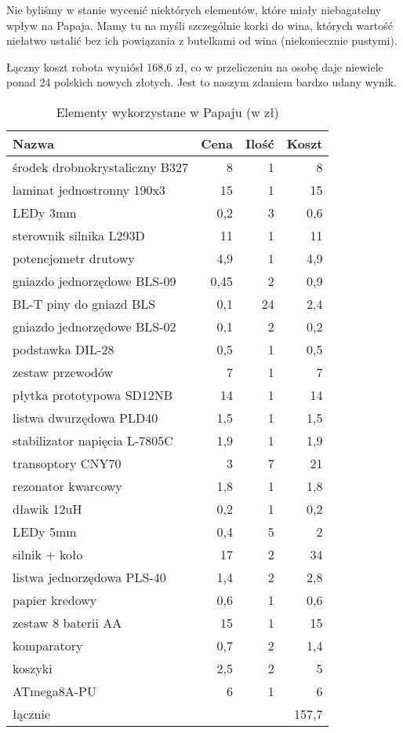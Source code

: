 \documentclass{article}
\begin{document}
Nie byliśmy w stanie wycenić niektórych elementów, które miały niebagatelny wpływ na Papaja. Mamy tu na myśli szczególnie korki do wina, których wartość niełatwo ustalić bez ich powiązania z butelkami od wina (niekoniecznie pustymi). 

Łączny koszt robota wyniósł 168,6 zł, co w przeliczeniu na osobę daje niewiele ponad 24 polskich nowych złotych. Jest to naszym zdaniem bardzo udany wynik.

\begin{table}[!htbp]
\centering
\caption{Elementy wykorzystane w Papaju (w zł)}
\label{table:koszta}
\begin{tabular}{l|r|r|r}
Nazwa                          & Cena & Ilość & Koszt \\
\hline
środek drobnokrystaliczny B327 & 8    & 1     & 8     \\
laminat jednostronny 190x3     & 15   & 1     & 15    \\
LEDy 3mm                       & 0,2  & 3     & 0,6   \\
sterownik silnika L293D        & 11   & 1     & 11    \\
potencjometr drutowy           & 4,9  & 1     & 4,9   \\
gniazdo jednorzędowe BLS-09    & 0,45 & 2     & 0,9   \\
BL-T piny do gniazd BLS        & 0,1  & 24    & 2,4   \\
gniazdo jednorzędowe BLS-02    & 0,1  & 2     & 0,2   \\
podstawka DIL-28               & 0,5  & 1     & 0,5   \\
zestaw przewodów               & 7    & 1     & 7     \\
płytka prototypowa SD12NB      & 14   & 1     & 14    \\
listwa dwurzędowa PLD40        & 1,5  & 1     & 1,5   \\
stabilizator napięcia L-7805C  & 1,9  & 1     & 1,9   \\
transoptory CNY70              & 3    & 7     & 21    \\
rezonator kwarcowy             & 1,8  & 1     & 1,8   \\
dławik 12uH                    & 0,2  & 1     & 0,2   \\
LEDy 5mm                       & 0,4  & 5     & 2     \\
silnik + koło                  & 17   & 2     & 34    \\
listwa jednorzędowa PLS-40     & 1,4  & 2     & 2,8   \\
papier kredowy                 & 0,6  & 1     & 0,6   \\
zestaw 8 baterii AA            & 15   & 1     & 15    \\
komparatory                    & 0,7  & 2     & 1,4   \\
koszyki                        & 2,5  & 2     & 5     \\
ATmega8A-PU                    & 6    & 1     & 6     \\
\hline
łącznie                          &      &       & 157,7
\end{tabular}


\end{table}
\end{document}
